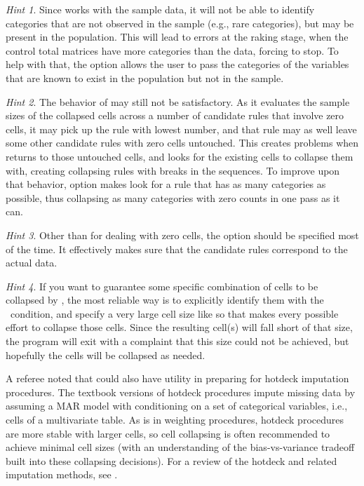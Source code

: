 \textit{Hint 1}. Since  works with the sample data,
it will not be able to identify categories that are not observed in the sample (e.g., rare categories),
but may be present in the population. This will lead to errors at the raking stage,
when the control total matrices have more categories than the data, forcing  to stop.
To help with that, the option  allows the user to pass the categories
of the variables that are known to exist in the population but not in the sample.

\textit{Hint 2}. The behavior of  may still not be
satisfactory. As it evaluates the sample sizes of the collapsed cells across a number
of candidate rules that involve zero cells, it may pick up the rule with lowest
number, and that rule may as well leave some other candidate rules with zero cells untouched.
This creates problems when  returns to those untouched cells,
and looks for the existing cells to collapse them with, creating collapsing rules with breaks
in the sequences. To improve upon that behavior, option  makes
 look for a rule that has as many categories as possible, thus collapsing
as many categories with zero counts in one pass as it can.

\textit{Hint 3}. Other than for dealing with zero cells, the option  should be specified
most of the time. It effectively makes sure that the candidate rules correspond to the actual data.

\textit{Hint 4}.
If you want to guarantee some specific combination of cells to be collapsed by ,
the most reliable way is to explicitly identify them with the \ifexp\ condition, and specify
a very large cell size like  so that  makes every possible
effort to collapse those cells. Since the resulting cell(s) will fall short of that size, the program will exit
with a complaint that this size could not be achieved,
but hopefully the cells will be collapsed as needed.

\bigskip

A referee noted that  could also have utility in preparing for hotdeck imputation procedures.
The textbook versions of hotdeck procedures impute missing data by assuming a MAR model \citep{rubin:1976}
with conditioning on a set of categorical variables, i.e., cells of a multivariate table. As is in weighting procedures,
hotdeck procedures are more stable with larger cells, so cell collapsing is often recommended to achieve
minimal cell sizes (with an understanding of the bias-vs-variance tradeoff built into these collapsing decisions).
For a review of the hotdeck and related imputation methods, see \citet{andridge:little:2010}.

